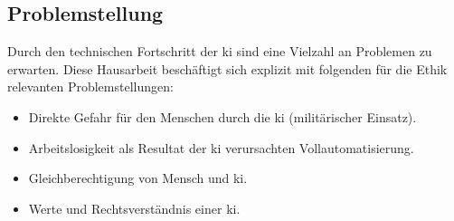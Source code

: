 \subsection{Problemstellung}
Durch den technischen Fortschritt der \ac{ki} sind eine Vielzahl an Problemen zu erwarten.
Diese Hausarbeit beschäftigt sich explizit mit folgenden für die Ethik relevanten Problemstellungen: 
\begin{itemize} 
	\item Direkte Gefahr für den Menschen durch die \ac{ki} (militärischer Einsatz).
	\item Arbeitslosigkeit als Resultat der \ac{ki} verursachten Vollautomatisierung.   
	\item Gleichberechtigung von Mensch und \ac{ki}.
	\item Werte und Rechtsverständnis einer \ac{ki}.
\end{itemize}
